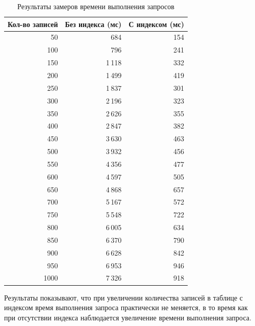 \begin{table}[H]
    \centering
    \caption{Результаты замеров времени выполнения запросов}
    \label{tbl:query_time}
    \setlength{\tabcolsep}{4pt} %
    \renewcommand{\arraystretch}{1.1} %
    \begin{tabular}{|r|r|r|}
        \hline
        \textbf{Кол-во записей} & \textbf{Без индекса (мс)} & \textbf{С индексом (мс)} \\
        \hline
        50 & 684 & 154 \\
        \hline
        100 & 796 & 241 \\
        \hline
        150 & 1\,118 & 332 \\
        \hline
        200 & 1\,499 & 419 \\
        \hline
        250 & 1\,837 & 301 \\
        \hline
        300 & 2\,196 & 323 \\
        \hline
        350 & 2\,626 & 355 \\
        \hline
        400 & 2\,847 & 382 \\
        \hline
        450 & 3\,630 & 463 \\
        \hline
        500 & 3\,932 & 456 \\
        \hline
        550 & 4\,356 & 477 \\
        \hline
        600 & 4\,597 & 505 \\
        \hline
        650 & 4\,868 & 657 \\
        \hline
        700 & 5\,167 & 572 \\
        \hline
        750 & 5\,548 & 722 \\
        \hline
        800 & 6\,005 & 634 \\
        \hline
        850 & 6\,370 & 790 \\
        \hline
        900 & 6\,628 & 842 \\
        \hline
        950 & 6\,953 & 946 \\
        \hline
        1000 & 7\,326 & 918 \\
        \hline
    \end{tabular}
\end{table}

Результаты показывают, что при увеличении количества записей в таблице с индексом время выполнения запроса практически не меняется, в то время как при отсутствии индекса наблюдается увеличение времени выполнения запроса.

